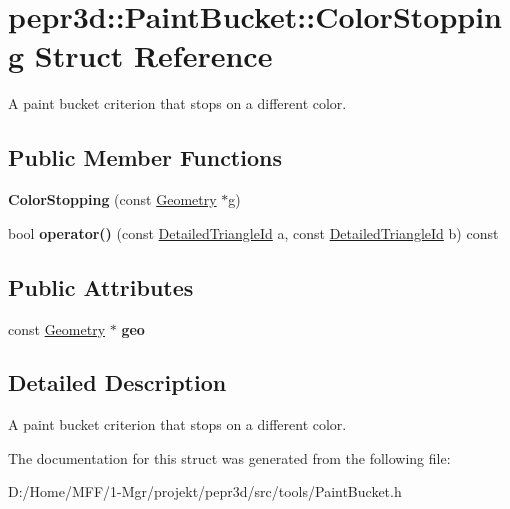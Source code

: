 \hypertarget{structpepr3d_1_1_paint_bucket_1_1_color_stopping}{}\section{pepr3d\+::Paint\+Bucket\+::Color\+Stopping Struct Reference}
\label{structpepr3d_1_1_paint_bucket_1_1_color_stopping}


A paint bucket criterion that stops on a different color.  


\subsection*{Public Member Functions}
\begin{DoxyCompactItemize}
\item 
\mbox{\label{structpepr3d_1_1_paint_bucket_1_1_color_stopping_aa9854e4872717fd4f65240fa13783be2}} 
{\bfseries Color\+Stopping} (const \mbox{\hyperlink{classpepr3d_1_1_geometry}{Geometry}} $\ast$g)
\item 
\mbox{\label{structpepr3d_1_1_paint_bucket_1_1_color_stopping_afca79420fc0059b51d53c829846009a9}} 
bool {\bfseries operator()} (const \mbox{\hyperlink{structpepr3d_1_1_detailed_triangle_id}{Detailed\+Triangle\+Id}} a, const \mbox{\hyperlink{structpepr3d_1_1_detailed_triangle_id}{Detailed\+Triangle\+Id}} b) const
\end{DoxyCompactItemize}
\subsection*{Public Attributes}
\begin{DoxyCompactItemize}
\item 
\mbox{\label{structpepr3d_1_1_paint_bucket_1_1_color_stopping_aa5f3760dc71038712627b65bd263af6f}} 
const \mbox{\hyperlink{classpepr3d_1_1_geometry}{Geometry}} $\ast$ {\bfseries geo}
\end{DoxyCompactItemize}


\subsection{Detailed Description}
A paint bucket criterion that stops on a different color. 

The documentation for this struct was generated from the following file\+:\begin{DoxyCompactItemize}
\item 
D\+:/\+Home/\+M\+F\+F/1-\/\+Mgr/projekt/pepr3d/src/tools/Paint\+Bucket.\+h\end{DoxyCompactItemize}
